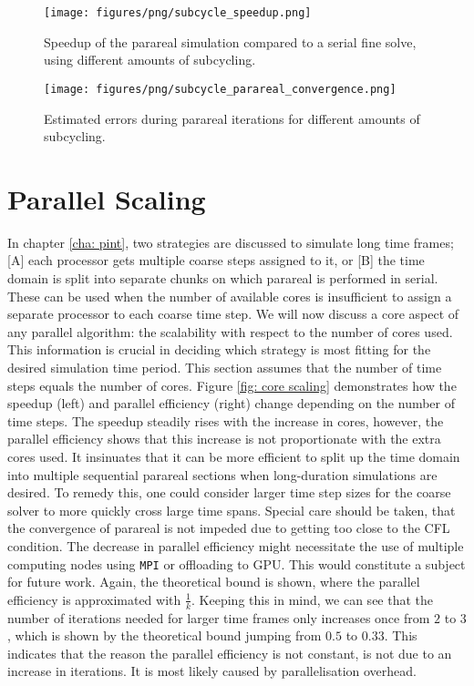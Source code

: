   \begin{figure}[h]
    \centering
    \texttt{[image: figures/png/subcycle\_speedup.png]}
    \caption{Speedup of the parareal simulation compared to a serial fine solve, using different amounts of subcycling.}
    \label{fig: temporal-subcycling}
\end{figure}

  \begin{figure}[h]
    \centering
    \texttt{[image: figures/png/subcycle\_parareal\_convergence.png]}
    \caption{Estimated errors during parareal iterations for different amounts of subcycling.}
    \label{fig: temporal-subcycling-errors}
\end{figure}

\section{Parallel Scaling}
In chapter \ref{cha: pint}, two strategies are discussed to simulate long time frames; [A] each processor gets multiple coarse steps assigned to it, or [B] the time domain is split into separate chunks on which parareal is performed in serial. These can be used when the number of available cores is insufficient to assign a separate processor to each coarse time step. 
We will now discuss a core aspect of any parallel algorithm: the scalability with respect to the number of cores used. This information is crucial in deciding which strategy is most fitting for the desired simulation time period. This section assumes that the number of time steps equals the number of cores. Figure \ref{fig: core scaling} demonstrates how the speedup (left) and parallel efficiency (right) change depending on the number of time steps. The speedup steadily rises with the increase in cores, however, the parallel efficiency shows that this increase is not proportionate with the extra cores used. It insinuates that it can be more efficient to split up the time domain into multiple sequential parareal sections when long-duration simulations are desired. To remedy this, one could consider larger time step sizes for the coarse solver to more quickly cross large time spans. Special care should be taken, that the convergence of parareal is not impeded due to getting too close to the CFL condition. The decrease in parallel efficiency might necessitate the use of multiple computing nodes using \texttt{MPI} or offloading to GPU. This would constitute a subject for future work. Again, the theoretical bound is shown, where the parallel efficiency is approximated with $\frac{1}{k}$. Keeping this in mind, we can see that the number of iterations needed for larger time frames only increases once from $2$ to $3$, which is shown by the theoretical bound jumping from $0.5$ to $0.33$. This indicates that the reason the parallel efficiency is not constant, is not due to an increase in iterations. It is most likely caused by parallelisation overhead.
